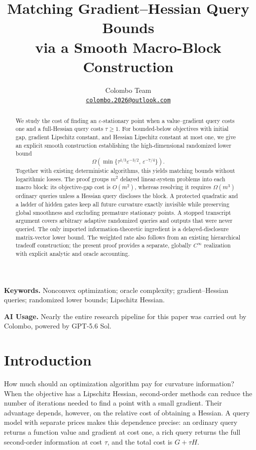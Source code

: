 \documentclass[11pt]{article}
\title{\bfseries Matching Gradient--Hessian Query Bounds\\
via a Smooth Macro-Block Construction}
\author{Colombo Team\\[0.3em]
  \small\href{mailto:colombo.2026@outlook.com}{\texttt{colombo.2026@outlook.com}}}
\date{}
\theoremstyle{definition}
\theoremstyle{remark}
\newcommand{\eps}{\varepsilon}
\begin{document}
\maketitle
\begin{abstract}
We study the cost of finding an $\eps$-stationary point when a
value--gradient query costs one and a full-Hessian query costs $\tau\ge1$.
For bounded-below objectives with initial gap, gradient Lipschitz constant,
and Hessian Lipschitz constant at most one, we give an explicit smooth
construction establishing the high-dimensional randomized lower bound
\[
 \Omega\!\left(\min\{\tau^{1/3}\eps^{-3/2},\,\eps^{-7/4}\}\right).
\]
Together with existing deterministic algorithms, this yields matching
bounds without logarithmic losses. The proof groups $m^2$ delayed
linear-system problems into each macro block: its objective-gap cost is
$O(m^2)$, whereas resolving it requires $\Omega(m^3)$ ordinary queries
unless a Hessian query discloses the block. A protected quadratic and a
ladder of hidden gates keep all future curvature exactly invisible while
preserving global smoothness and excluding premature stationary points.
A stopped transcript argument covers arbitrary adaptive randomized
queries and outputs that were never queried. The only imported
information-theoretic ingredient is a delayed-disclosure matrix-vector
lower bound. The weighted rate also follows from an existing hierarchical
tradeoff construction; the present proof provides a separate,
globally $C^\infty$ realization with explicit analytic and oracle accounting.
\end{abstract}

\noindent\textbf{Keywords.}
Nonconvex optimization; oracle complexity; gradient--Hessian queries;
randomized lower bounds; Lipschitz Hessian.
\par\medskip
\begin{samepage}
\noindent\textbf{AI Usage.}
Nearly the entire research pipeline for this paper was carried out by
Colombo, powered by GPT-5.6 Sol.
\par
\end{samepage}

\section{Introduction}\label{sec:introduction}
How much should an optimization algorithm pay for curvature information?
When the objective has a Lipschitz Hessian, second-order methods can reduce
the number of iterations needed to find a point with a small gradient.
Their advantage depends, however, on the relative cost of obtaining a
Hessian. A query model with separate prices makes this dependence precise:
an ordinary query returns a function value and gradient at cost one, a
rich query returns the full second-order information at cost $\tau$, and
the total cost is $G+\tau H$.
\end{document}
